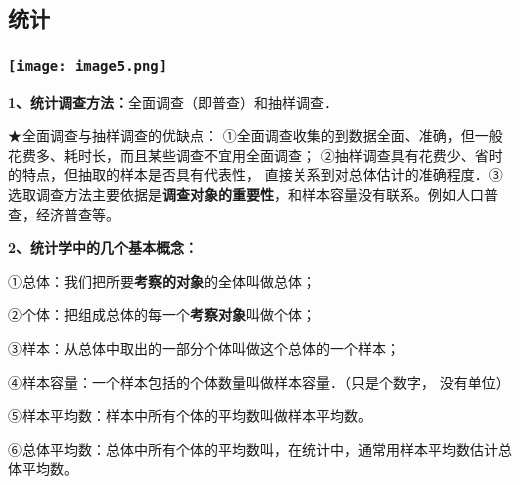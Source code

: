 \hypertarget{ux7edfux8ba1}{%
\subsection{\texorpdfstring{ 统计}{ 统计}}\label{ux7edfux8ba1}}

\hypertarget{ux5b66ux79d1ux7f51www.zxxk.com--ux6559ux80b2ux8d44ux6e90ux95e8ux6237ux63d0ux4f9bux8bd5ux9898ux8bd5ux5377ux6559ux6848ux8bfeux4ef6ux6559ux5b66ux8bbaux6587ux7d20ux6750ux7b49ux5404ux7c7bux6559ux5b66ux8d44ux6e90ux5e93ux4e0bux8f7dux8fd8ux6709ux5927ux91cfux4e30ux5bccux7684ux6559ux5b66ux8d44ux8baf-42}{%
\subsubsection{\texorpdfstring{\protect\texttt{[image: image5.png]}}{学科网(www.zxxk.com)-\/-教育资源门户，提供试题试卷、教案、课件、教学论文、素材等各类教学资源库下载，还有大量丰富的教学资讯！}}\label{ux5b66ux79d1ux7f51www.zxxk.com--ux6559ux80b2ux8d44ux6e90ux95e8ux6237ux63d0ux4f9bux8bd5ux9898ux8bd5ux5377ux6559ux6848ux8bfeux4ef6ux6559ux5b66ux8bbaux6587ux7d20ux6750ux7b49ux5404ux7c7bux6559ux5b66ux8d44ux6e90ux5e93ux4e0bux8f7dux8fd8ux6709ux5927ux91cfux4e30ux5bccux7684ux6559ux5b66ux8d44ux8baf-42}}

\textbf{1、统计调查方法：}全面调查（即普查）和抽样调查．

★全面调查与抽样调查的优缺点：
①全面调查收集的到数据全面、准确，但一般花费多、耗时长，而且某些调查不宜用全面调查；
②抽样调查具有花费少、省时的特点，但抽取的样本是否具有代表性，
直接关系到对总体估计的准确程度．③选取调查方法主要依据是\textbf{调查对象的重要性}，和样本容量没有联系。例如人口普查，经济普查等。

\textbf{2、统计学中的几个基本概念：}

①总体：我们把所要\textbf{考察的对象}的全体叫做总体；

②个体：把组成总体的每一个\textbf{考察对象}叫做个体；

③样本：从总体中取出的一部分个体叫做这个总体的一个样本；

④样本容量：一个样本包括的个体数量叫做样本容量．（只是个数字， 没有单位）

⑤样本平均数：样本中所有个体的平均数叫做样本平均数。

⑥总体平均数：总体中所有个体的平均数叫，在统计中，通常用样本平均数估计总体平均数。

